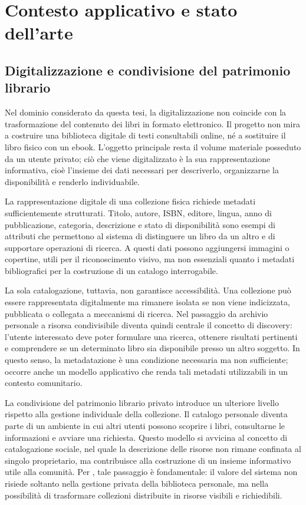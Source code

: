 \chapter{Contesto applicativo e stato dell'arte}
\label{chap:stato-arte}

\section{Digitalizzazione e condivisione del patrimonio librario}
\label{sec:digitalizzazione-patrimonio}

Nel dominio considerato da questa tesi, la digitalizzazione non coincide con la trasformazione del contenuto dei libri in formato elettronico. Il progetto non mira a costruire una biblioteca digitale di testi consultabili online, né a sostituire il libro fisico con un ebook. L'oggetto principale resta il volume materiale posseduto da un utente privato; ciò che viene digitalizzato è la sua rappresentazione informativa, cioè l'insieme dei dati necessari per descriverlo, organizzarne la disponibilità e renderlo individuabile.

La rappresentazione digitale di una collezione fisica richiede metadati sufficientemente strutturati. Titolo, autore, ISBN, editore, lingua, anno di pubblicazione, categoria, descrizione e stato di disponibilità sono esempi di attributi che permettono al sistema di distinguere un libro da un altro e di supportare operazioni di ricerca. A questi dati possono aggiungersi immagini o copertine, utili per il riconoscimento visivo, ma non essenziali quanto i metadati bibliografici per la costruzione di un catalogo interrogabile.

La sola catalogazione, tuttavia, non garantisce accessibilità. Una collezione può essere rappresentata digitalmente ma rimanere isolata se non viene indicizzata, pubblicata o collegata a meccanismi di ricerca. Nel passaggio da archivio personale a risorsa condivisibile diventa quindi centrale il concetto di discovery: l'utente interessato deve poter formulare una ricerca, ottenere risultati pertinenti e comprendere se un determinato libro sia disponibile presso un altro soggetto. In questo senso, la metadatazione è una condizione necessaria ma non sufficiente; occorre anche un modello applicativo che renda tali metadati utilizzabili in un contesto comunitario.

La condivisione del patrimonio librario privato introduce un ulteriore livello rispetto alla gestione individuale della collezione. Il catalogo personale diventa parte di un ambiente in cui altri utenti possono scoprire i libri, consultarne le informazioni e avviare una richiesta. Questo modello si avvicina al concetto di catalogazione sociale, nel quale la descrizione delle risorse non rimane confinata al singolo proprietario, ma contribuisce alla costruzione di un insieme informativo utile alla comunità. Per \projectname{}, tale passaggio è fondamentale: il valore del sistema non risiede soltanto nella gestione privata della biblioteca personale, ma nella possibilità di trasformare collezioni distribuite in risorse visibili e richiedibili.

